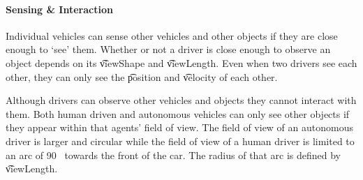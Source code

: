 

\paragraph{Sensing \& Interaction} 
Individual vehicles can sense other vehicles and other objects if they are close enough to `see' them. Whether or not a driver is close enough to observe an object depends on its \t{viewShape} and \t{viewLength}. Even when two drivers see each other, they can only see the \t{position} and \t{velocity} of each other.

Although drivers can observe other vehicles and objects they cannot interact with them. Both human driven and autonomous vehicles can only see other objects if they appear within that agents' field of view. The field of view of an autonomous driver is larger and circular while the field of view of a human driver is limited to an arc of \si{90\degrees} towards the front of the car. The radius of that arc is defined by \t{viewLength}.



